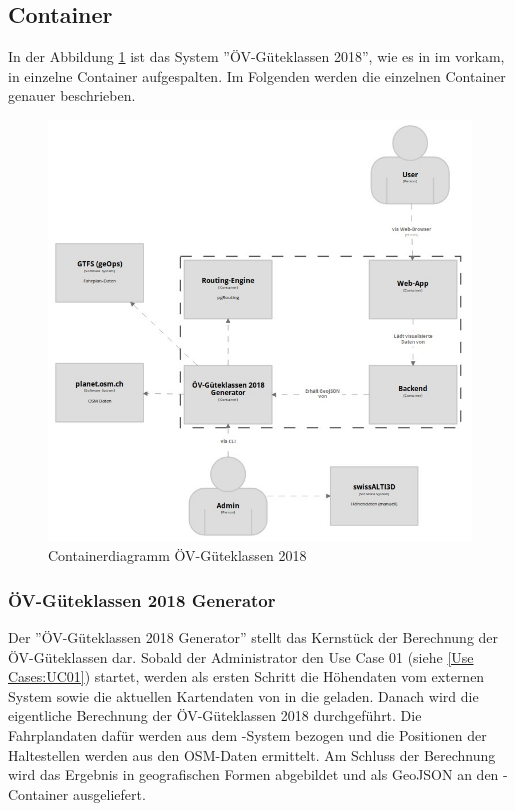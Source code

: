 \subsection{Container}
\label{Architektur:Container}

In der Abbildung \ref{fig:container-diagram} ist das System ''ÖV-Güteklassen 2018'', wie es in im  vorkam, in einzelne Container aufgespalten.
Im Folgenden werden die einzelnen Container genauer beschrieben.

\begin{figure}[ht]
    \centering
    \includegraphics[width=0.8\linewidth]{projectdoc/img/container-diagram.png}
    \caption[Containerdiagramm]{Containerdiagramm ÖV-Güteklassen 2018}
    \label{fig:container-diagram}
\end{figure}

\subsubsection{ÖV-Güteklassen 2018 Generator}
\label{container:generator}

Der ''\acs{ÖV}-Güteklassen 2018 Generator'' stellt das Kernstück der Berechnung der \acs{ÖV}-Güteklassen dar.
Sobald der Administrator den Use Case 01 (siehe \ref{Use Cases:UC01}) startet, werden als ersten Schritt die Höhendaten vom externen System  sowie die aktuellen Kartendaten von  in die  geladen.
Danach wird die eigentliche Berechnung der \acs{ÖV}-Güteklassen 2018 durchgeführt.
Die Fahrplandaten dafür werden aus dem -System bezogen und die Positionen der Haltestellen werden aus den \ac{OSM}-Daten ermittelt.
Am Schluss der Berechnung wird das Ergebnis in geografischen Formen abgebildet und als \gls{GeoJSON} an den -Container ausgeliefert.

